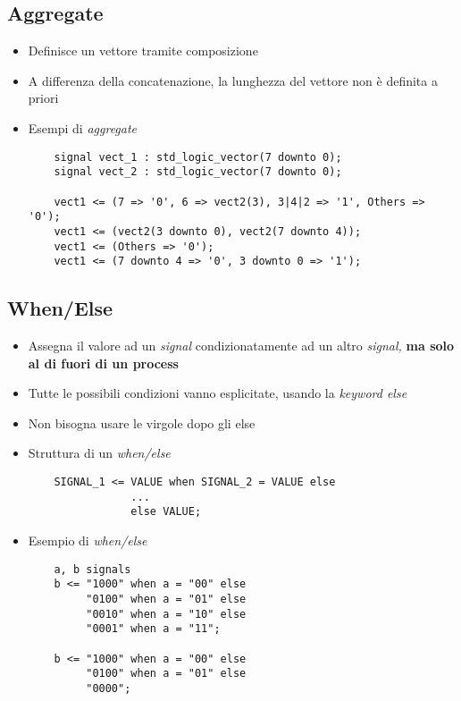 \documentclass{article}
\begin{document}
\subsection{Aggregate}
\begin{itemize}
	\item Definisce un vettore tramite composizione
	\item A differenza della concatenazione, la lunghezza del vettore non è definita a priori
	
	\item Esempi di \textit{aggregate}
	      \begin{verbatim}
    signal vect_1 : std_logic_vector(7 downto 0);
    signal vect_2 : std_logic_vector(7 downto 0);
        
    vect1 <= (7 => '0', 6 => vect2(3), 3|4|2 => '1', Others => '0');
    vect1 <= (vect2(3 downto 0), vect2(7 downto 4));
    vect1 <= (Others => '0');
    vect1 <= (7 downto 4 => '0', 3 downto 0 => '1');
	      \end{verbatim}
\end{itemize}

\subsection{When/Else}
\begin{itemize}
	\item Assegna il valore ad un \textit{signal} condizionatamente ad un altro \textit{signal,} \textbf{ma solo al di fuori di un process}
	\item Tutte le possibili condizioni vanno esplicitate, usando la \textit{keyword else}
	\item Non bisogna usare le virgole dopo gli else
	\item Struttura di un \textit{when/else}
	      \begin{verbatim}
    SIGNAL_1 <= VALUE when SIGNAL_2 = VALUE else
                ...
                else VALUE;
	      \end{verbatim}
	\item Esempio di \textit{when/else}
	      \begin{verbatim}
    a, b signals
    b <= "1000" when a = "00" else
         "0100" when a = "01" else
         "0010" when a = "10" else
         "0001" when a = "11";
             
    b <= "1000" when a = "00" else
         "0100" when a = "01" else
         "0000";
	      \end{verbatim}
\end{itemize}
\end{document}

